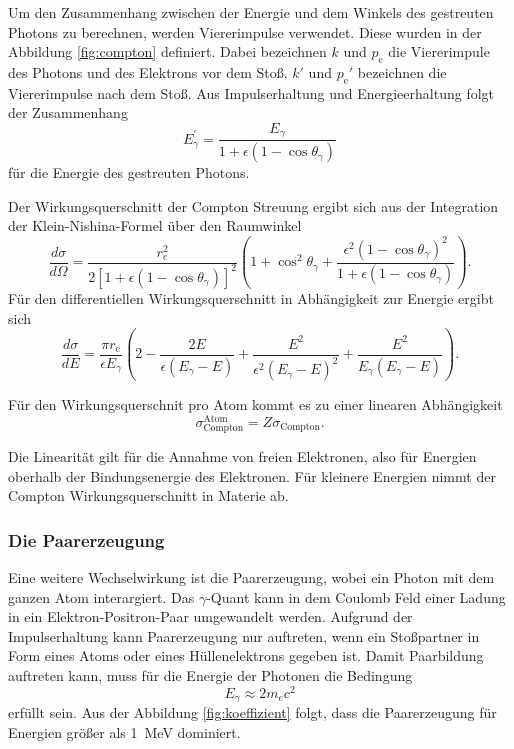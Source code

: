 Um den Zusammenhang zwischen der Energie und dem Winkels des gestreuten Photons
zu berechnen, werden Viererimpulse verwendet. Diese wurden in der Abbildung \ref{fig:compton} definiert.
Dabei bezeichnen $k$ und $p_{\text{e}}$ die Viererimpule des Photons und des Elektrons vor dem Stoß.
$k'$ und $p_{\text{e}}'$ bezeichnen die Viererimpulse nach dem Stoß.
Aus Impulserhaltung und Energieerhaltung folgt der Zusammenhang
\begin{equation}
    E_\gamma^{\prime}=\frac{E_\gamma}{1+\epsilon\left(1-\cos \theta_\gamma\right)}
    \label{eqn:Energie_comptonstreuung}
\end{equation}
für die Energie des gestreuten Photons.

Der Wirkungsquerschnitt der Compton Streuung ergibt sich aus der Integration der Klein-Nishina-Formel über den Raumwinkel
\begin{equation}
    \frac{d \sigma}{d \Omega}=\frac{r_e^2}{2\left[1+\epsilon\left(1-\cos \theta_\gamma\right)\right]^2}\left(1+\cos ^2 \theta_\gamma+\frac{\epsilon^2\left(1-\cos \theta_\gamma\right)^2}{1+\epsilon\left(1-\cos \theta_\gamma\right)}\right).
\end{equation}
Für den differentiellen Wirkungsquerschnitt in Abhängigkeit zur Energie ergibt sich 
\begin{equation}
    \frac{d \sigma}{d E} = \frac{\pi r_{\text{e}}}{\epsilon E_\gamma} \left(2 - \frac{2 E}{\epsilon \left(E_\gamma - E \right)}+ \frac{E^2}{\epsilon^2 \left(E_\gamma - E \right)^2} + \frac{E^2}{E_\gamma \left(E_\gamma - E \right)}\right).
    \label{eqn:Wirkungsquerschnitt}
\end{equation}

Für den Wirkungsquerschnit pro Atom kommt es zu einer linearen Abhängigkeit
\begin{equation}
    \sigma_{\text{Compton}}^{\text{Atom}}=Z \sigma_{\text{Compton}}.
\end{equation}

Die Linearität gilt für die Annahme von freien Elektronen, also für Energien oberhalb der
Bindungsenergie des Elektronen.
Für kleinere Energien nimmt der Compton Wirkungsquerschnitt in Materie ab.

\subsubsection{Die Paarerzeugung}
\label{paarerzeugung}

Eine weitere Wechselwirkung ist die Paarerzeugung, wobei ein Photon mit dem ganzen Atom interargiert.
Das $\gamma$-Quant kann in dem Coulomb Feld einer Ladung in ein Elektron-Positron-Paar umgewandelt werden.
Aufgrund der Impulserhaltung kann Paarerzeugung nur auftreten, wenn ein Stoßpartner in Form eines Atoms oder eines Hüllenelektrons
gegeben ist.
Damit Paarbildung auftreten kann, muss für die Energie der Photonen die Bedingung 
\begin{equation}
    E_\gamma \approx 2 m_e c^2
\end{equation}
erfüllt sein. 
Aus der Abbildung \ref{fig:koeffizient} folgt, dass die Paarerzeugung für Energien größer als \qty{1}{\mega\eV} dominiert.

